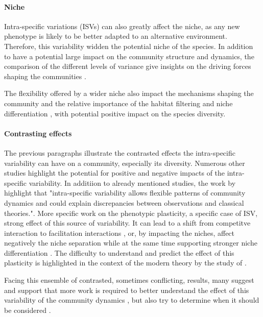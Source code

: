 \paragraph{Niche}

Intra-specific variations (ISVs) can also greatly affect the niche, as any new phenotype is likely to be better adapted to an alternative environment. Therefore, this variability widden the potential niche of the species. In addition to have a potential large impact on the community structure and dynamics, the comparison of the different levels of variance give insights on the driving forces shaping the communities \parencite{violle_return_2012}.

The flexibility offered by a wider niche also impact the mechanisms shaping the community and the relative importance of the habitat filtering and niche differentiation \parencite{jung_intraspecific_2010}, with potential positive impact on the species diversity.
%
%
%


\paragraph{Contrasting effects}

The previous paragraphs illustrate the contrasted effects the intra-specific variability can have on a community, especially its diversity. Numerous other studies highlight the potential for positive and negative impacts of the intra-specific variability. In additiion to already mentioned studies, the work by \citet{courbaud_intra-specific_2010} highlight that "intra-specific variability allows flexible patterns of community dynamics and could explain discrepancies between observations and classical theories.". More specific work on the phenotypic plasticity, a specific case of ISV, strong effect of this source of variability. It can lead to a shift from competitve interaction to facilitation interactions \parencite{callaway_phenotypic_2003}, or, by impacting the niches, affect negatively the niche separation while at the same time supporting stronger niche differentiation \parencite{roscher_contrasting_2015}. The difficulty to understand and predict the effect of this plasticity is highlighted in the context of the modern theory by the study of \citet{turcotte_phenotypic_2016}. 

Facing this ensemble of contrasted, sometimes conflicting, results, many suggest and support that more work is required to better understand the effect of this variability of the community dynamics \parencite{ bolnick_why_2011, violle_return_2012, valladares_species_2015}, but also try to determine when it should be considered \parencite{albert_when_2011}.\\


